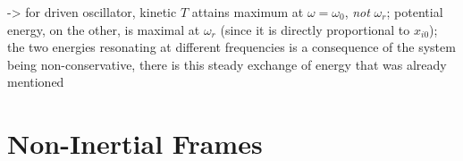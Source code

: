 \documentclass[../class_mech_main.tex]{subfiles}
\begin{document}
-> for driven oscillator, kinetic $T$ attains maximum at $\omega = \omega_0$, \emph{not} $\omega_r$; potential energy, on the other, is maximal at $\omega_r$ (since it is directly proportional to $x_{i0}$); the two energies resonating at different frequencies is a consequence of the system being non-conservative, there is this steady exchange of energy that was already mentioned



    \section{Non-Inertial Frames}
	\label{sec:non_inertial_frames}
% 
% 

\end{document}
